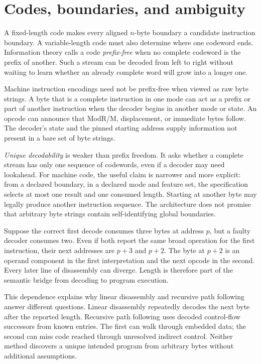 \section{Codes, boundaries, and ambiguity}

A fixed-length code makes every aligned \(n\)-byte boundary a candidate
instruction boundary. A variable-length code must also determine where one
codeword ends. Information theory calls a code \emph{prefix-free} when no
complete codeword is the prefix of another. Such a stream can be decoded from
left to right without waiting to learn whether an already complete word will
grow into a longer one.

Machine instruction encodings need not be prefix-free when viewed as raw byte
strings. A byte that is a complete instruction in one mode can act as a prefix
or part of another instruction when the decoder begins in another mode or
state. An opcode can announce that ModR/M, displacement, or immediate bytes
follow. The decoder's state and the pinned starting address supply information
not present in a bare set of byte strings.

\emph{Unique decodability} is weaker than prefix freedom. It asks whether a
complete stream has only one sequence of codewords, even if a decoder may need
lookahead. For machine code, the useful claim is narrower and more explicit:
from a declared boundary, in a declared mode and feature set, the specification
selects at most one result and one consumed length. Starting at another byte
may legally produce another instruction sequence. The architecture does not
promise that arbitrary byte strings contain self-identifying global
boundaries.

\begin{example}[title={One wrong length changes a suffix}]
Suppose the correct first decode consumes three bytes at address \(p\), but a
faulty decoder consumes two. Even if both report the same broad operation for
the first instruction, their next addresses are \(p+3\) and \(p+2\). The byte
at \(p+2\) is an operand component in the first interpretation and the next
opcode in the second. Every later line of disassembly can diverge. Length is
therefore part of the semantic bridge from decoding to program execution.
\end{example}

This dependence explains why linear disassembly and recursive path following
answer different questions. Linear disassembly repeatedly decodes the next byte
after the reported length. Recursive path following uses decoded control-flow
successors from known entries. The first can walk through embedded data; the
second can miss code reached through unresolved indirect control. Neither
method discovers a unique intended program from arbitrary bytes without
additional assumptions.

